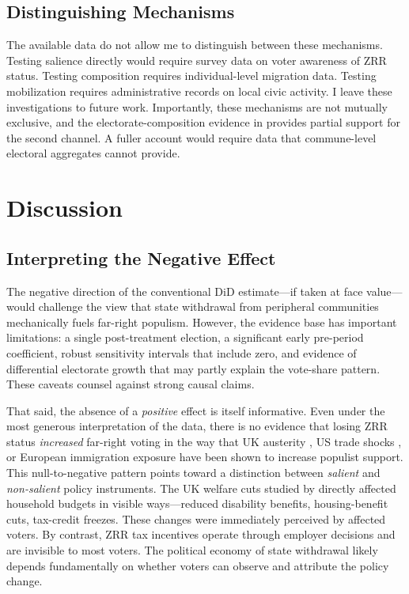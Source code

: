 \documentclass[12pt]{article}
\begin{document}
\subsection{Distinguishing Mechanisms}

The available data do not allow me to distinguish between these mechanisms. Testing salience directly would require survey data on voter awareness of ZRR status. Testing composition requires individual-level migration data. Testing mobilization requires administrative records on local civic activity. I leave these investigations to future work. Importantly, these mechanisms are not mutually exclusive, and the electorate-composition evidence in  provides partial support for the second channel. A fuller account would require data that commune-level electoral aggregates cannot provide.

\section{Discussion}

\subsection{Interpreting the Negative Effect}

The negative direction of the conventional DiD estimate---if taken at face value---would challenge the view that state withdrawal from peripheral communities mechanically fuels far-right populism. However, the evidence base has important limitations: a single post-treatment election, a significant early pre-period coefficient, robust sensitivity intervals that include zero, and evidence of differential electorate growth that may partly explain the vote-share pattern. These caveats counsel against strong causal claims.

That said, the absence of a \textit{positive} effect is itself informative. Even under the most generous interpretation of the data, there is no evidence that losing ZRR status \textit{increased} far-right voting in the way that UK austerity \citep{fetzer2019austerity}, US trade shocks \citep{autor2020importing}, or European immigration exposure \citep{dustmann2017refugee} have been shown to increase populist support. This null-to-negative pattern points toward a distinction between \textit{salient} and \textit{non-salient} policy instruments. The UK welfare cuts studied by \citet{fetzer2019austerity} directly affected household budgets in visible ways---reduced disability benefits, housing-benefit cuts, tax-credit freezes. These changes were immediately perceived by affected voters. By contrast, ZRR tax incentives operate through employer decisions and are invisible to most voters. The political economy of state withdrawal likely depends fundamentally on whether voters can observe and attribute the policy change.
\end{document}
